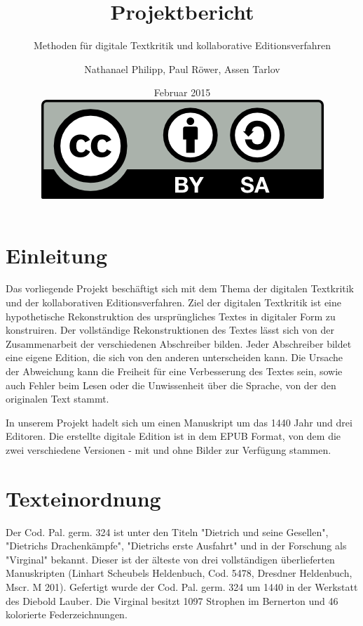 \documentclass[a4paper, 12pt, oneside]{scrbook}
\author{Nathanael Philipp, Paul Röwer, Assen Tarlov}
\title{Projektbericht}
\subtitle{Methoden für digitale Textkritik und kollaborative Editionsverfahren}
\date{Februar 2015\\\vspace{18em}\includegraphics{by-sa.png}}
\begin{document}
\maketitle\newpage
\tableofcontents\newpage
\chapter{Einleitung}

Das vorliegende Projekt beschäftigt sich mit dem Thema der digitalen Textkritik und der kollaborativen Editionsverfahren. 
Ziel der digitalen Textkritik ist eine hypothetische Rekonstruktion des ursprüngliches Textes in digitaler Form zu konstruiren. Der vollständige Rekonstruktionen des Textes lässt sich von der Zusammenarbeit der verschiedenen Abschreiber bilden. Jeder Abschreiber bildet eine eigene Edition, die sich von den anderen unterscheiden kann. Die Ursache der Abweichung kann die Freiheit für eine Verbesserung des Textes sein, sowie auch Fehler beim Lesen oder die Unwissenheit über die Sprache, von der den originalen Text stammt.  

In unserem Projekt hadelt sich um einen Manuskript um das 1440 Jahr und drei Editoren. Die erstellte digitale Edition ist in dem EPUB Format, von dem die zwei verschiedene Versionen - mit und ohne Bilder zur Verfügung stammen. 


\chapter{Texteinordnung}
Der Cod. Pal. germ. 324 ist unter den Titeln "Dietrich und seine Gesellen", "Dietrichs Drachenkämpfe", "Dietrichs erste Ausfahrt" und in der Forschung als "Virginal" bekannt. Dieser ist der älteste von drei vollständigen überlieferten Manuskripten (Linhart Scheubels Heldenbuch, Cod. 5478, Dresdner Heldenbuch, Mscr. M 201). Gefertigt wurde der Cod. Pal. germ. 324 um 1440 in der Werkstatt des Diebold Lauber. Die Virginal besitzt 1097 Strophen im Bernerton und 46 kolorierte Federzeichnungen.\cite{ubheidelber_bibpal}
\end{document}
